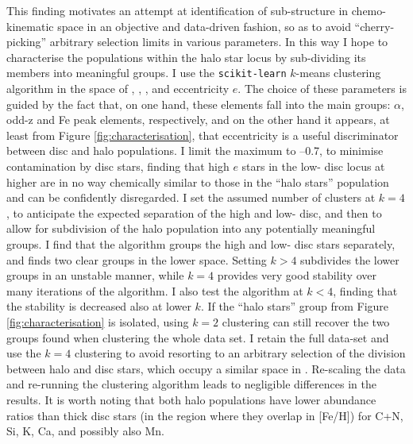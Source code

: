  This finding motivates an attempt at identification
of sub-structure in chemo-kinematic space in an objective and
data-driven fashion, so as to avoid ``cherry-picking'' arbitrary
selection limits in various parameters.  In this way I hope to
characterise the populations within the halo star locus by sub-dividing
its members into meaningful groups.  I use the \texttt{scikit-learn}
$k$-means clustering algorithm \citep{scikit-learn} in the space
of \feh{}, \mgfe{}, \alfe{}, \nife{} and eccentricity $e$.  The
choice of these parameters is guided by the fact that, on one hand,
these elements fall into the main groups: $\alpha$, odd-z and Fe
peak elements, respectively, and on the other hand it appears, at
least from Figure \ref{fig:characterisation}, that eccentricity is
a useful discriminator between disc and halo populations.  I limit
the maximum \feh{} to --0.7, to minimise contamination by disc
stars, finding that high $e$ stars in the low-\afe{} disc locus at
higher \feh{} are in no way chemically similar to those in the ``halo
stars'' population and can be confidently disregarded. I set the
assumed number of clusters at $k= 4$, to anticipate the expected
separation of the high and low-\afe{} disc, and then to allow for
subdivision of the halo population into any potentially meaningful
groups.  I find that the algorithm groups the high and low-\afe{}
disc stars separately, and finds two clear groups in the lower
\feh{} space.  Setting $k>4$ subdivides the lower \feh{} groups in
an unstable manner, while $k=4$ provides very good stability over
many iterations of the algorithm. I also test the algorithm at $k
< 4$, finding that the stability is decreased also at lower $k$.
If the ``halo stars'' group from Figure \ref{fig:characterisation}
is isolated, using $k=2$ clustering can still recover the two groups
found when clustering the whole data set. I retain the full data-set
and use the $k=4$ clustering to avoid resorting to an arbitrary
selection of the division between halo and disc stars, which occupy a similar space in \feh{}. Re-scaling
the data and re-running the clustering algorithm leads to
negligible differences in the results. It is worth noting that
both halo populations have lower abundance ratios than thick disc
stars (in the region where they overlap in [Fe/H]) for C+N, Si, K,
Ca, and possibly also Mn.

